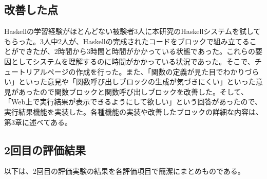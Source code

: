 \documentclass{risepaper}
\begin{document}
   		\subsection{改善した点}
        
Haskellの学習経験がほとんどない被験者3人に本研究のHaskellシステムを試してもらった。3人中2人が、Haskellの完成されたコードをブロックで組み立てることができたが、2時間から3時間と時間がかかっている状態であった。これらの要因としてシステムを理解するのに時間がかかっている状況であった。そこで、チュートリアルページの作成を行った。また、「関数の定義が見た目でわかりづらい」といった意見や「関数呼び出しブロックの生成が気づきにくい」といった意見があったので関数ブロックと関数呼び出しブロックを改善した。そして、「Web上で実行結果が表示できるようにして欲しい」という回答があったので、実行結果機能を実装した。各種機能の実装や改善したブロックの詳細な内容は、第3章に述べてある。

		\subsection{2回目の評価結果}

以下は、2回目の評価実験の結果を各評価項目で簡潔にまとめものである。
\end{document}
